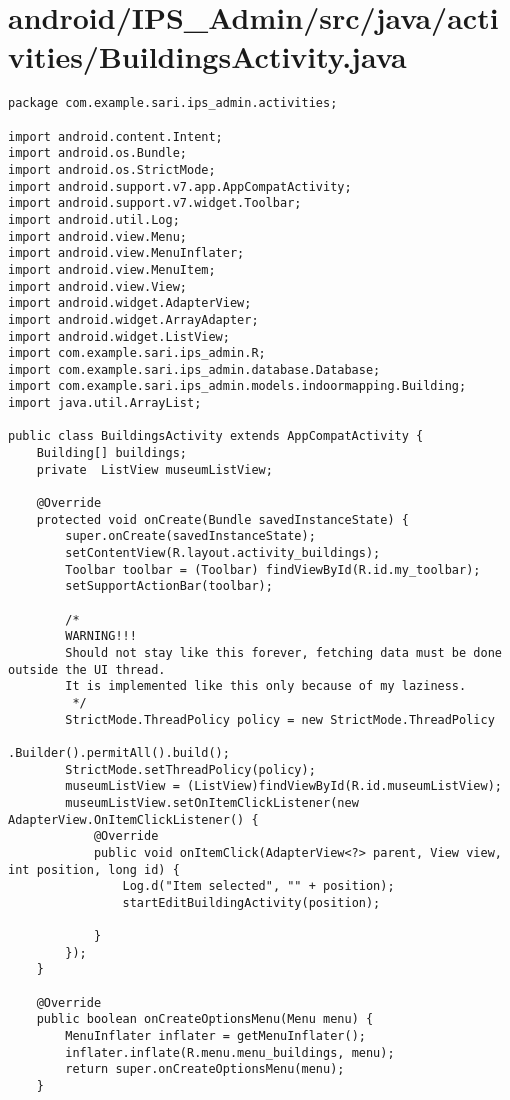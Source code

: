 \section{android/IPS\_Admin/src/java/activities/BuildingsActivity.java}
\begin{lstlisting}package com.example.sari.ips_admin.activities;

import android.content.Intent;
import android.os.Bundle;
import android.os.StrictMode;
import android.support.v7.app.AppCompatActivity;
import android.support.v7.widget.Toolbar;
import android.util.Log;
import android.view.Menu;
import android.view.MenuInflater;
import android.view.MenuItem;
import android.view.View;
import android.widget.AdapterView;
import android.widget.ArrayAdapter;
import android.widget.ListView;
import com.example.sari.ips_admin.R;
import com.example.sari.ips_admin.database.Database;
import com.example.sari.ips_admin.models.indoormapping.Building;
import java.util.ArrayList;

public class BuildingsActivity extends AppCompatActivity {
    Building[] buildings;
    private  ListView museumListView;

    @Override
    protected void onCreate(Bundle savedInstanceState) {
        super.onCreate(savedInstanceState);
        setContentView(R.layout.activity_buildings);
        Toolbar toolbar = (Toolbar) findViewById(R.id.my_toolbar);
        setSupportActionBar(toolbar);

        /*
        WARNING!!!
        Should not stay like this forever, fetching data must be done outside the UI thread.
        It is implemented like this only because of my laziness.
         */
        StrictMode.ThreadPolicy policy = new StrictMode.ThreadPolicy
                                        .Builder().permitAll().build();
        StrictMode.setThreadPolicy(policy);
        museumListView = (ListView)findViewById(R.id.museumListView);
        museumListView.setOnItemClickListener(new AdapterView.OnItemClickListener() {
            @Override
            public void onItemClick(AdapterView<?> parent, View view, int position, long id) {
                Log.d("Item selected", "" + position);
                startEditBuildingActivity(position);

            }
        });
    }

    @Override
    public boolean onCreateOptionsMenu(Menu menu) {
        MenuInflater inflater = getMenuInflater();
        inflater.inflate(R.menu.menu_buildings, menu);
        return super.onCreateOptionsMenu(menu);
    }


\end{lstlisting}
